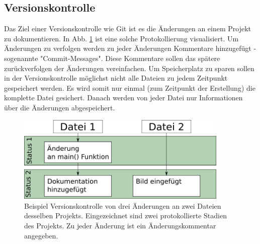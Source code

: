 \subsection{Versionskontrolle}
Das Ziel einer Versionskontrolle wie Git ist es die Änderungen an einem Projekt zu dokumentieren. In Abb. \ref{fig:vers-kontrol}
ist eine solche Protokollierung visualisiert. Um Änderungen zu verfolgen werden zu jeder Änderungen Kommentare hinzugefügt - sogenannte "Commit-Messages". Diese Kommentare sollen das spätere zurückverfolgen der Änderungen vereinfachen. Um Speicherplatz zu sparen sollen in der Versionskontrolle möglichst nicht alle Dateien zu jedem Zeitpunkt gespeichert werden. Es wird somit nur einmal (zum Zeitpunkt der Erstellung) die komplette Datei gesichert. Danach werden von jeder Datei nur Informationen über die Änderungen abgespeichert.
\begin{figure}[!h]
    \centering
    \includegraphics[width=0.9\textwidth]{Bilder/Versioncontrol.png}
    \caption{Beispiel Versionskontrolle von drei Änderungen an zwei Dateien desselben Projekts. Eingezeichnet sind zwei protokollierte Stadien des Projekts. Zu jeder Änderung ist ein Änderungskommentar angegeben.}
    \label{fig:vers-kontrol}
\end{figure}